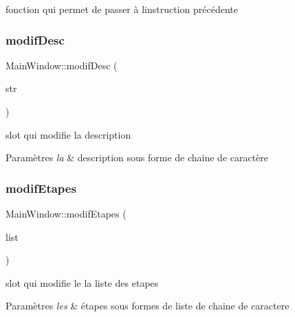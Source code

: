 fonction qui permet de passer à l\textquotesingle{}instruction précédente 

\mbox{\label{classMainWindow_a77ada7a541d869ea7f3647900ba6f6df}} 
\subsubsection{\texorpdfstring{modif\+Desc}{modifDesc}}
{\footnotesize\ttfamily Main\+Window\+::modif\+Desc (\begin{DoxyParamCaption}\item[{Q\+String}]{str }\end{DoxyParamCaption})\hspace{0.3cm}{\ttfamily [slot]}}



slot qui modifie la description 


\begin{DoxyParams}{Paramètres}
{\em la} & description sous forme de chaine de caractère \\
\hline
\end{DoxyParams}
\mbox{\label{classMainWindow_a1a85241ab332ebb026638ff0a6df83e0}} 
\subsubsection{\texorpdfstring{modif\+Etapes}{modifEtapes}}
{\footnotesize\ttfamily Main\+Window\+::modif\+Etapes (\begin{DoxyParamCaption}\item[{Q\+String\+List}]{list }\end{DoxyParamCaption})\hspace{0.3cm}{\ttfamily [slot]}}



slot qui modifie le la liste des etapes 


\begin{DoxyParams}{Paramètres}
{\em les} & étapes sous formes de liste de chaine de caractere \\
\hline
\end{DoxyParams}
\mbox{\label{classMainWindow_a64a5116401b4a54c55c6a7d34fc7ec93}} 
